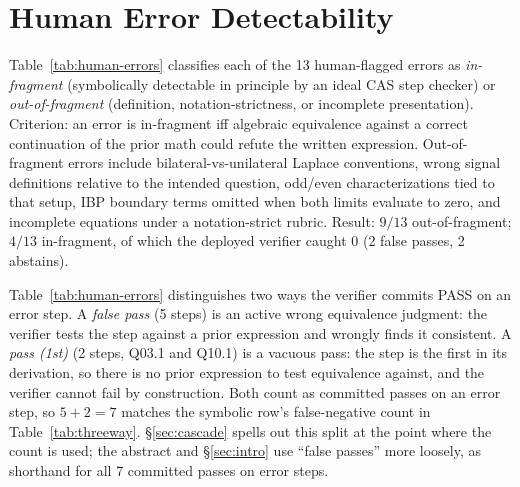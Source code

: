 \section{Human Error Detectability}
\label{app:human-errors}

Table~\ref{tab:human-errors} classifies each of the 13 human-flagged errors as
\emph{in-fragment} (symbolically detectable in principle by an ideal CAS step
checker) or \emph{out-of-fragment} (definition, notation-strictness, or
incomplete presentation). Criterion: an error is in-fragment iff algebraic
equivalence against a correct continuation of the prior math could refute the
written expression. Out-of-fragment errors include bilateral-vs-unilateral
Laplace conventions, wrong signal definitions relative to the intended question,
odd/even characterizations tied to that setup, IBP boundary terms omitted when
both limits evaluate to zero, and incomplete equations under a notation-strict
rubric. Result: $9/13$ out-of-fragment; $4/13$ in-fragment, of which the
deployed verifier caught $0$ (2 false passes, 2 abstains).

Table~\ref{tab:human-errors} distinguishes two ways the verifier commits PASS
on an error step. A \emph{false pass} (5 steps) is an active wrong equivalence
judgment: the verifier tests the step against a prior expression and wrongly
finds it consistent. A \emph{pass (1st)} (2 steps, Q03.1 and Q10.1) is a
vacuous pass: the step is the first in its derivation, so there is no prior
expression to test equivalence against, and the verifier cannot fail by
construction. Both count as committed passes on an error step, so $5+2=7$
matches the symbolic row's false-negative count in Table~\ref{tab:threeway}.
\S\ref{sec:cascade} spells out this split at the point where the count is
used; the abstract and \S\ref{sec:intro} use ``false passes'' more loosely, as
shorthand for all 7 committed passes on error steps.

